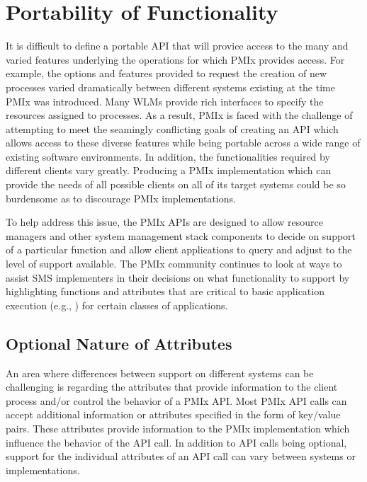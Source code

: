 \section{Portability of Functionality}
\label{chap:intro:not_supported}

It is difficult to define a portable \ac{API} that will provice access to the many             
and varied features underlying the operations for which \ac{PMIx} provides access.
For example, the options and features provided to request the creation
of new processes varied dramatically between different systems existing
at the time \ac{PMIx} was introduced.  Many \acp{WLM} provide rich interfaces
to specify the resources assigned to processes.
As a result, \ac{PMIx} is faced with the challenge
of attempting to meet the seamingly conflicting goals of creating an \ac{API} which allows
access to these diverse features while being portable across a wide range of
existing software environments. In addition, the functionalities required by different 
clients vary greatly.  Producing a \ac{PMIx} implementation
which can provide the needs of all possible clients on all of its target systems
could be so burdensome as to discourage \ac{PMIx} implementations.

To help address this issue, the \ac{PMIx} \acp{API} are designed to allow resource managers 
and other system management stack components to decide on support of a 
particular function and allow client applications to query and adjust to the level of support available. 
The \ac{PMIx} community continues to look at ways to assist \ac{SMS} implementers in their decisions 
on what functionality to support by highlighting functions and attributes that are 
critical to basic application execution (e.g., ) for certain classes of applications.

\subsection{Optional Nature of Attributes}

An area where differences between support on different systems can be challenging is regarding the attributes that provide information to the client process and/or control the behavior of a \ac{PMIx} \ac{API}.  Most
\ac{PMIx} \ac{API} calls can accept additional information or attributes specified in the form of 
key/value pairs. These attributes provide information to the \ac{PMIx} implementation which influence the 
behavior of the \ac{API} call.  In addition to \ac{API} calls being optional, support for the 
individual attributes of an \ac{API} call can vary between systems or implementations.   

